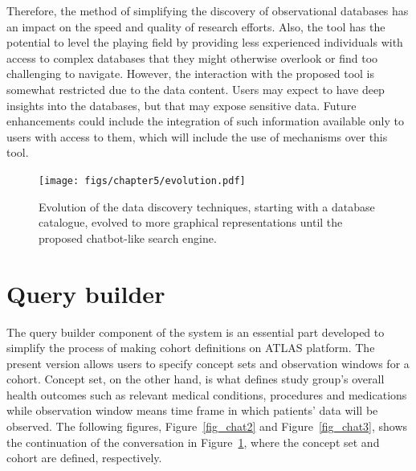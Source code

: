 Therefore, the method of simplifying the discovery of observational databases has an impact on the speed and quality of research efforts. Also, the tool has the potential to level the playing field by providing less experienced individuals with access to complex databases that they might otherwise overlook or find too challenging to navigate. However, the interaction with the proposed tool is somewhat restricted due to the data content. Users may expect to have deep insights into the databases, but that may expose sensitive data. Future enhancements could include the integration of such information available only to users with access to them, which will include the use of {\rbac} mechanisms over this tool.



\begin{figure}[H]
    \texttt{[image: figs/chapter5/evolution.pdf]}
    \centering
	\caption[Evolution of the data discovery techniques]{Evolution of the data discovery techniques, starting with a database catalogue, evolved to more graphical representations until the proposed chatbot-like search engine.}
    \label{fig_chat1}
\end{figure}


\section{Query builder}



The query builder component of the system is an essential part developed to simplify the process of making cohort definitions on ATLAS platform. The present version allows users to specify concept sets and observation windows for a cohort. Concept set, on the other hand, is what defines study group's overall health outcomes such as relevant medical conditions, procedures and medications while observation window means time frame in which patients' data will be observed. The following figures, Figure~\ref{fig_chat2} and Figure~\ref{fig_chat3}, shows the continuation of the conversation in Figure~\ref{fig_chat1}, where the concept set and cohort are defined, respectively.

